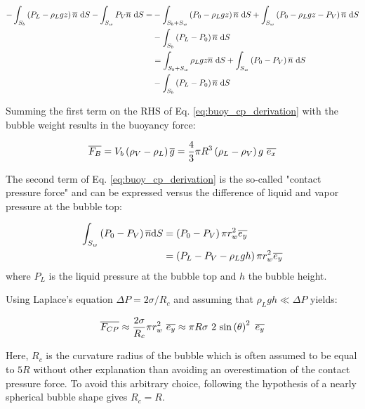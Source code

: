 \begin{align}
\nonumber- \int_{S_{b}}\parth{P_{L} - \rho_{L}gz}\vect{n}\ \mathrm{d}S - \int_{S_{w}} P_{V}\vect{n}\ \mathrm{d}S =& - \int_{S_{b} + S_{w}} \parth{P_{0} - \rho_{L}gz}\vect{n}\ \mathrm{d}S + \int_{S_{w}} \parth{P_{0} - \rho_{L}gz - P_{V}}\vect{n}\ \mathrm{d}S \\
\nonumber & - \int_{S_{b}} \parth{P_{L}-P_{0}}\vect{n}\ \mathrm{d}S \\
\nonumber & = \int_{S_{b} + S_{w}} \rho_{L} g z \vect{n}\ \mathrm{d}S + \int_{S_{w}}\parth{P_{0} - P_{V}}\vect{n}\ \mathrm{d}S\\
& - \int_{S_{b}} \parth{P_{L} - P_{0}}\vect{n}\ \mathrm{d}S
\label{eq:buoy_cp_derivation}
\end{align}

Summing the first term on the RHS of Eq. \ref{eq:buoy_cp_derivation} with the bubble weight results in the buoyancy force:


\begin{equation}
\overline{F_{B}}= V_{b}\left( \rho_{V}-\rho_{L} \right)\overline{g}=\frac{4}{3}\pi R^{3}\left( \rho_{L}-\rho_{V} \right)g \ \overline{e_{x}}
\label{eq:force_buoyancy}
\end{equation}


The second term of Eq. \ref{eq:buoy_cp_derivation} is the so-called "contact pressure force" and can be expressed versus the difference of liquid and vapor pressure at the bubble top:

\begin{align}
\int_{S_{w}} \left( P_{0} - P_{V} \right)\overline{n} \mathrm{d}S &= \left( P_{0}-P_{V} \right)\pi r_{w}^{2}\overline{e_{y}}\\
&= \left( P_{L} - P_{V} - \rho_{L}gh \right) \pi r_{w}^{2} \overline{e_{y}}
\end{align}
where $P_{L}$ is the liquid pressure at the bubble top and $h$ the bubble height.

\npar
Using Laplace's equation $\Delta P = 2\sigma / R_{c}$ and assuming that $\rho_{L}gh \ll \Delta P$ yields:

\begin{align}
\overline{F_{CP}}  \approx \frac{2\sigma}{R_{c}} \pi r_{w}^{2}\  \overline{e_{y}}
\approx \pi R \sigma\ 2\ \mathrm{sin}\left( \theta \right)^{2}\ \overline{e_{y}}
\label{eq:FCP}
\end{align}

Here, $R_{c}$ is the curvature radius of the bubble which is often assumed to be equal to $5R$ \cite{klausner_vapor_1993, sugrue_modified_2016, mazzocco_reassessed_2018} without other explanation than avoiding an overestimation of the contact pressure force. To avoid this arbitrary choice, following the hypothesis of a nearly spherical bubble shape gives $R_{c}=R$.


